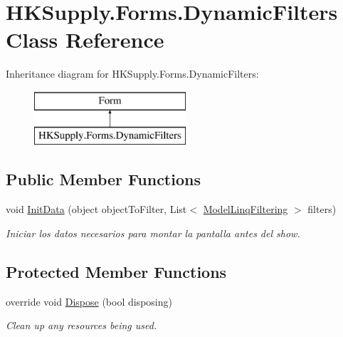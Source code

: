 \hypertarget{class_h_k_supply_1_1_forms_1_1_dynamic_filters}{}\section{H\+K\+Supply.\+Forms.\+Dynamic\+Filters Class Reference}
\label{class_h_k_supply_1_1_forms_1_1_dynamic_filters}
Inheritance diagram for H\+K\+Supply.\+Forms.\+Dynamic\+Filters\+:\begin{figure}[H]
\begin{center}
\leavevmode
\includegraphics[height=2.000000cm]{class_h_k_supply_1_1_forms_1_1_dynamic_filters}
\end{center}
\end{figure}
\subsection*{Public Member Functions}
\begin{DoxyCompactItemize}
\item 
void \hyperlink{class_h_k_supply_1_1_forms_1_1_dynamic_filters_a3fb309c2a83dbe6c5826c25007c5336f}{Init\+Data} (object object\+To\+Filter, List$<$ \hyperlink{class_h_k_supply_1_1_forms_1_1_model_linq_filtering}{Model\+Linq\+Filtering} $>$ filters)
\begin{DoxyCompactList}\small\item\em Iniciar los datos necesarios para montar la pantalla antes del show. \end{DoxyCompactList}\end{DoxyCompactItemize}
\subsection*{Protected Member Functions}
\begin{DoxyCompactItemize}
\item 
override void \hyperlink{class_h_k_supply_1_1_forms_1_1_dynamic_filters_a02f9f684c77b0ed2ba2aca58c0b87ec3}{Dispose} (bool disposing)
\begin{DoxyCompactList}\small\item\em Clean up any resources being used. \end{DoxyCompactList}\end{DoxyCompactItemize}
